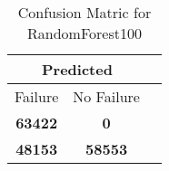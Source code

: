 \begin{table}[] 
\caption{Confusion Matric for RandomForest100} 
\label{Table: Prediction Accuracy-NoneRandomForest100RandomForest100EKF-ignoresolarPanelDipole-solarPanelDipole} 
\centering 
\begin{tabular} 
 {@{}ccc@{}} 
\toprule 
\multicolumn{2}{c}{\textbf{Predicted}}
 \\ \midrule 
\multicolumn{1}{|c|}{Failure} & 
\multicolumn{1}{c|}{No Failure}
 \\ \midrule 
\multicolumn{1}{|c|}{\color{green}\textbf{63422}} & 
\multicolumn{1}{c|}{\color{red}\textbf{0}}
 \\ \midrule 
\multicolumn{1}{|c|}{\color{red}\textbf{48153}} & 
\multicolumn{1}{c|}{\color{green}\textbf{58553}}
 \\ \bottomrule 
\end{tabular} 
\end{table} 
